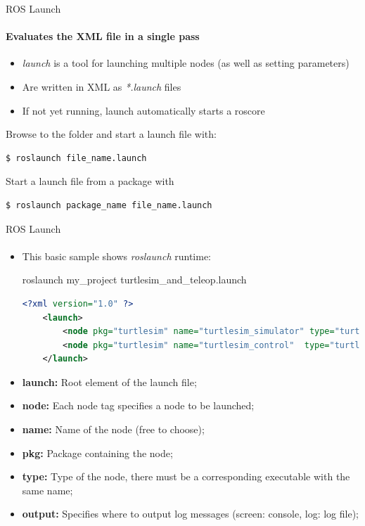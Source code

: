 \documentclass[aspectratio=169]{beamer}
\begin{document}
\begin{frame}[fragile]{ROS Launch}
	\framesubtitle{Evaluates the XML file in a single pass}
	\begin{itemize}
		\item \textit{launch} is a tool for launching multiple nodes (as well as setting parameters)
		\item Are written in XML as \textit{*.launch} files
		\item If not yet running, launch automatically starts a roscore
	\end{itemize}

	Browse to the folder and start a launch file with:
	
	\begin{lstlisting}[language=bash]
		$ roslaunch file_name.launch
	\end{lstlisting}

	Start a launch file from a package with

	\begin{lstlisting}[language=bash]
		$ roslaunch package_name file_name.launch
	\end{lstlisting}
\end{frame}

\begin{frame}[fragile]{ROS Launch}
	\framesubtitle{}

	\begin{itemize}
		\item This basic sample shows \textit{roslaunch} runtime:
	
	\begin{block}{roslaunch my\_project turtlesim\_and\_teleop.launch}
		\begin{lstlisting}[language=XML]
	<?xml version="1.0" ?>
	<launch>
		<node pkg="turtlesim" name="turtlesim_simulator" type="turtlesim_node"></node>
		<node pkg="turtlesim" name="turtlesim_control"  type="turtle_teleop_key"></node>
	</launch>
		\end{lstlisting}
	\end{block}

		\item \textbf{launch:} Root element of the launch file;
		\item \textbf{node:} Each node tag specifies a node to be launched;
		\item \textbf{name:} Name of the node (free to choose);
		\item \textbf{pkg:} Package containing the node;
		\item \textbf{type:} Type of the node, there must be a corresponding executable with the same name;
		\item \textbf{output:} Specifies where to output log messages (screen: console, log: log file);
	
	\end{itemize}

\end{frame}
\end{document}
